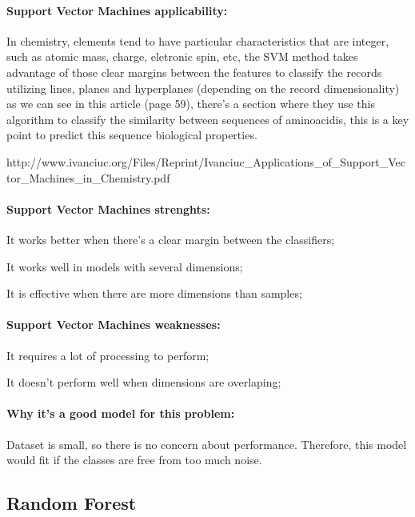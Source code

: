 \documentclass[11pt]{article}
\begin{document}
\paragraph{Support Vector Machines
applicability:}\label{support-vector-machines-applicability}

In chemistry, elements tend to have particular characteristics that are
integer, such as atomic mass, charge, eletronic spin, etc, the SVM
method takes advantage of those clear margins between the features to
classify the records utilizing lines, planes and hyperplanes (depending
on the record dimensionality) as we can see in this article (page 59),
there's a section where they use this algorithm to classify the
similarity between sequences of aminoacidis, this is a key point to
predict this sequence biological properties.

http://www.ivanciuc.org/Files/Reprint/Ivanciuc\_Applications\_of\_Support\_Vector\_Machines\_in\_Chemistry.pdf

\paragraph{Support Vector Machines
strenghts:}\label{support-vector-machines-strenghts}

It works better when there's a clear margin between the classifiers;

It works well in models with several dimensions;

It is effective when there are more dimensions than samples;

\paragraph{Support Vector Machines
weaknesses:}\label{support-vector-machines-weaknesses}

It requires a lot of processing to perform;

It doesn't perform well when dimensions are overlaping;

\paragraph{Why it's a good model for this
problem:}\label{why-its-a-good-model-for-this-problem-1}

Dataset is small, so there is no concern about performance. Therefore,
this model would fit if the classes are free from too much noise.

\subsection{Random Forest}\label{random-forest}
\end{document}
